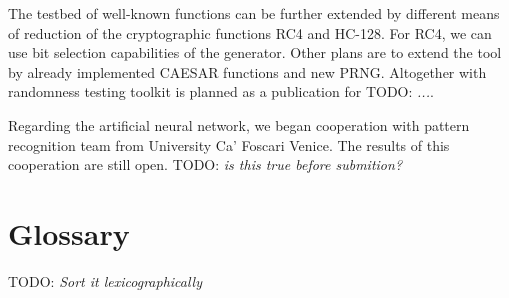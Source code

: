 \documentclass[
  print, %
  Table,   %
  nolof,     %
  nolot,     %
  11pt, %
  oneside  %
]{fithesis3}
\newcommand{\todo}[1]{TODO: \textit{#1}}
\begin{document}
The testbed of well-known functions can be further extended by different means of reduction of the cryptographic functions RC4 and HC-128. For RC4, we can use bit selection capabilities of the generator. Other plans are to extend the tool by already implemented CAESAR functions and new PRNG. Altogether with randomness testing toolkit is planned as a publication for \todo{...}.

Regarding the artificial neural network, we began cooperation with pattern recognition team from University Ca’ Foscari Venice. The results of this cooperation are still open. \todo{is this true before submition?}



\printbibliography[heading=bibintoc] %

\appendix{}

\chapter{Glossary}
\label{sec:app-glos}

\todo{Sort it lexicographically}
\end{document}
